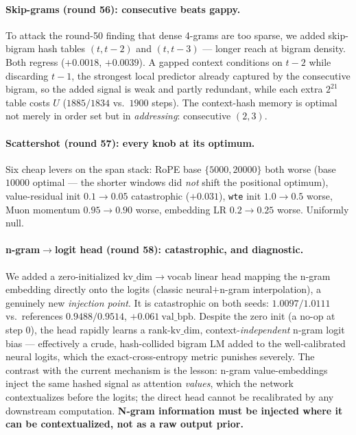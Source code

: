\documentclass{article}
\newcommand{\valbpb}{\mathrm{val\_bpb}}
\begin{document}
\paragraph{Skip-grams (round 56): consecutive beats gappy.} To attack the round-50 finding that dense 4-grams are too sparse, we added skip-bigram hash tables $(t,t{-}2)$ and $(t,t{-}3)$ --- longer reach at bigram density. Both regress ($+0.0018$, $+0.0039$). A gapped context conditions on $t{-}2$ while discarding $t{-}1$, the strongest local predictor already captured by the consecutive bigram, so the added signal is weak and partly redundant, while each extra $2^{21}$ table costs $U$ ($1885/1834$ vs.\ $1900$ steps). The context-hash memory is optimal not merely in order set but in \emph{addressing}: consecutive $(2,3)$.

\paragraph{Scattershot (round 57): every knob at its optimum.} Six cheap levers on the span stack: RoPE base $\{5000,20000\}$ both worse (base $10000$ optimal --- the shorter windows did \emph{not} shift the positional optimum), value-residual init $0.1\to0.05$ catastrophic ($+0.031$), \texttt{wte} init $1.0\to0.5$ worse, Muon momentum $0.95\to0.90$ worse, embedding LR $0.2\to0.25$ worse. Uniformly null.

\paragraph{n-gram$\to$logit head (round 58): catastrophic, and diagnostic.} We added a zero-initialized $\mathrm{kv\_dim}\to$vocab linear head mapping the n-gram embedding directly onto the logits (classic neural$+$n-gram interpolation), a genuinely new \emph{injection point}. It is catastrophic on both seeds: $1.0097/1.0111$ vs.\ references $0.9488/0.9514$, $+0.061\ \valbpb$. Despite the zero init (a no-op at step 0), the head rapidly learns a rank-$\mathrm{kv\_dim}$, context-\emph{independent} n-gram logit bias --- effectively a crude, hash-collided bigram LM added to the well-calibrated neural logits, which the exact-cross-entropy metric punishes severely. The contrast with the current mechanism is the lesson: n-gram value-embeddings inject the same hashed signal as attention \emph{values}, which the network contextualizes before the logits; the direct head cannot be recalibrated by any downstream computation. \textbf{N-gram information must be injected where it can be contextualized, not as a raw output prior.}
\end{document}
